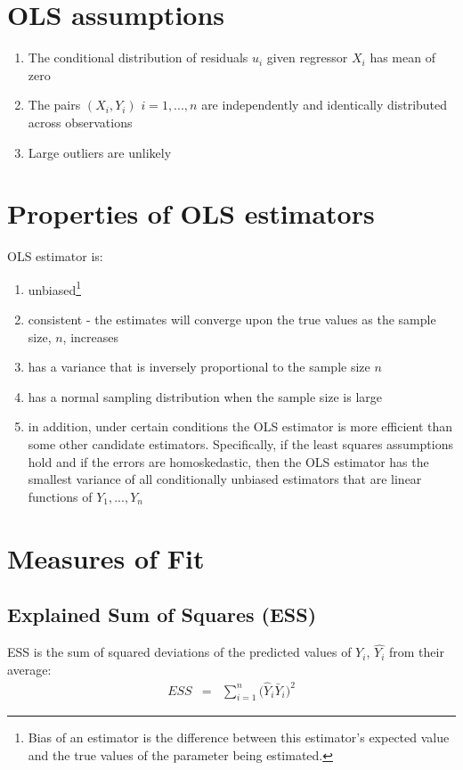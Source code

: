 \section{OLS assumptions}
\begin{enumerate}
	\item The conditional distribution of residuals $u_{i}$ given regressor $X_{i}$ has mean of zero
	\item The pairs $(X_{i}, Y_{i})$ $i = 1, ..., n$ are independently and identically distributed across observations
	\item Large outliers are unlikely
\end{enumerate}

\section{Properties of OLS estimators}
OLS estimator is:
\begin{enumerate}
	\item unbiased\footnote{Bias of an estimator is the difference between this estimator's expected value and the true values of the parameter being estimated.}
	\item consistent - the estimates will converge upon the true values as the sample size, $n$, increases
	\item has a variance that is inversely proportional to the sample size $n$
	\item has a normal sampling distribution when the sample size is large
	\item in addition, under certain conditions the OLS estimator is more efficient than some other candidate estimators. Specifically, if the least squares assumptions hold and if the errors are homoskedastic, then the OLS estimator has the smallest variance of all conditionally unbiased estimators that are linear functions of $Y_{1}, ..., Y_{n}$  
\end{enumerate}

\section{Measures of Fit}

\subsection{Explained Sum of Squares (ESS)}
ESS is the sum of squared deviations of the predicted values of $Y_{i}$, $\hat{Y_{i}}$ from their average:
\begin{eqnarray}
	ESS &=& \sum_{i = 1}^{n}\big(\hat{Y}_{i} \bar{Y}_{i}\big)^{2}
\end{eqnarray}



